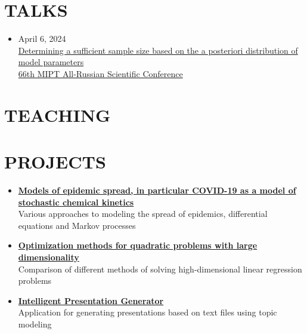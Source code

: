 \documentclass[11pt,a4paper]{moderncv}
\begin{document}
\section{TALKS}
\begin{itemize}
    \item April 6, 2024\\
    \href{https://www.youtube.com/live/WnIRaRl730A?si=q0eScgnDP2ZidCpK&t=1723}{Determining a sufficient sample size based on the a posteriori distribution of model parameters}\\
    \href{https://conf.mipt.ru/}{66th MIPT All-Russian Scientific Conference}
\end{itemize}

\section{TEACHING}

\section{PROJECTS}
\begin{itemize}
    \item \href{https://github.com/kisnikser/Epidemic-Spread-Models}{\textbf{Models of epidemic spread, in particular COVID-19 as a model of stochastic chemical kinetics}}\\
    Various approaches to modeling the spread of epidemics, differential equations and Markov processes
    \item \href{https://github.com/kisnikser/Optimization-Methods}{\textbf{Optimization methods for quadratic problems with large dimensionality}}\\
    Comparison of different methods of solving high-dimensional linear regression problems
    \item \href{https://github.com/kisnikser/Intelligent-Presentation-Generator}{\textbf{Intelligent Presentation Generator}}\\
    Application for generating presentations based on text files using topic modeling
\end{itemize}
\end{document}
